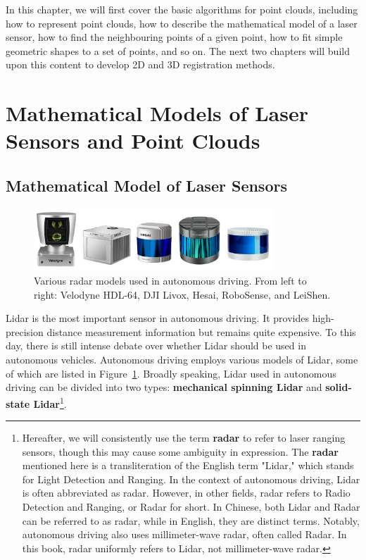 In this chapter, we will first cover the basic algorithms for point clouds, including how to represent point clouds, how to describe the mathematical model of a laser sensor, how to find the neighbouring points of a given point, how to fit simple geometric shapes to a set of points, and so on. The next two chapters will build upon this content to develop 2D and 3D registration methods.  



\section{Mathematical Models of Laser Sensors and Point Clouds}  
\subsection{Mathematical Model of Laser Sensors}  
\begin{figure}[!htp]  
	\centering  
	\includegraphics[width=0.8\textwidth]{resources/basic-point-cloud/lidars.pdf}  
	\caption{Various radar models used in autonomous driving. From left to right: Velodyne HDL-64, DJI Livox, Hesai, RoboSense, and LeiShen.}  
	\label{fig:lidars}  
\end{figure}  

Lidar is the most important sensor in autonomous driving. It provides high-precision distance measurement information but remains quite expensive. To this day, there is still intense debate over whether Lidar should be used in autonomous vehicles. Autonomous driving employs various models of Lidar, some of which are listed in Figure~\ref{fig:lidars}. Broadly speaking, Lidar used in autonomous driving can be divided into two types: \textbf{mechanical spinning Lidar} and \textbf{solid-state Lidar}\footnote{Hereafter, we will consistently use the term \textbf{radar} to refer to laser ranging sensors, though this may cause some ambiguity in expression. The \textbf{radar} mentioned here is a transliteration of the English term "Lidar," which stands for Light Detection and Ranging. In the context of autonomous driving, Lidar is often abbreviated as radar. However, in other fields, radar refers to Radio Detection and Ranging, or Radar for short. In Chinese, both Lidar and Radar can be referred to as radar, while in English, they are distinct terms. Notably, autonomous driving also uses millimeter-wave radar, often called Radar. In this book, radar uniformly refers to Lidar, not millimeter-wave radar.}.  

